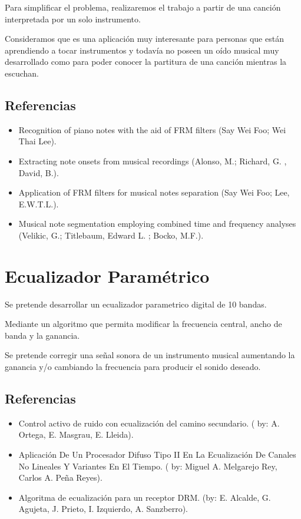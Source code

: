 \documentclass[a4paper,10pt]{article}
\begin{document}
	Para simplificar el problema, realizaremos el trabajo a partir
	de una canción interpretada por un solo instrumento.

	Consideramos que es una aplicación muy interesante para personas
	que están aprendiendo a tocar instrumentos y todavía no poseen
	un oído musical muy desarrollado como para poder conocer la
	partitura de una canción mientras la escuchan.

	\subsection*{Referencias}
		\begin{itemize}
			\item Recognition of piano notes with the aid
			of FRM filters (Say Wei Foo; Wei Thai Lee).
			\item Extracting note onsets from musical
			recordings (Alonso, M.; Richard, G. , David, B.).
			\item Application of FRM filters for musical
			notes separation (Say Wei Foo; Lee, E.W.T.L.).
			\item Musical note segmentation employing
			combined time and frequency analyses (Velikic,
			G.; Titlebaum, Edward L. ; Bocko, M.F.).
		\end{itemize}

	\clearpage

\section*{Ecualizador Paramétrico}
Se pretende desarrollar un ecualizador parametrico digital de 10 bandas.

 Mediante un algoritmo que permita modificar la frecuencia central, ancho
de banda y la ganancia.

Se pretende corregir una señal sonora de un instrumento musical
aumentando la  ganancia y/o cambiando la frecuencia para producir el
sonido deseado.

	\subsection*{Referencias}
		\begin{itemize}
			\item Control activo de ruido con ecualización
			del camino secundario. ( by: A. Ortega,
			E. Masgrau, E. Lleida).
			\item Aplicación De Un Procesador Difuso Tipo
			II En La Ecualización De Canales No Lineales
			Y Variantes En El Tiempo. ( by: Miguel A.
			Melgarejo Rey, Carlos A. Peña Reyes).
			\item Algoritma de ecualización para un receptor
			DRM. (by: E. Alcalde, G.  Agujeta, J. Prieto,
			I. Izquierdo, A. Sanzberro).
		\end{itemize}

	\clearpage
\end{document}
